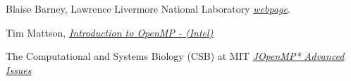 \documentclass[a4paper, 10pt, conference]{IEEEtran}      %
\begin{document}
\begin{thebibliography}{1}
	
	  Blaise Barney, Lawrence Livermore National Laboratory {\em \href{https://computing.llnl.gov/tutorials/openMP/}{webpage}}.
	
	 Tim Mattson, {\em \href{https://www.youtube.com/playlist?list=PLLX-Q6B8xqZ8n8bwjGdzBJ25X2utwnoEG}{Introduction to OpenMP - (Intel)}  }
	
	The Computational and Systems Biology (CSB) at MIT {\em \href{http://csbi.mit.edu/technology/intel_fce/doc/main_for/mergedProjects/optaps_for/ccp/optaps_par_openmp_adv_c.htm}{JOpenMP* Advanced Issues}} 
		
	
\end{thebibliography}
\end{document}
